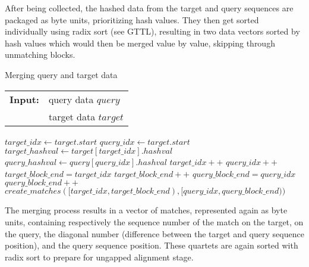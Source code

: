 After being collected, the hashed data from the target and query sequences are packaged as byte units, prioritizing hash values. They then get sorted individually using radix sort (see GTTL), resulting in two data vectors sorted by hash values which would then be merged value by value, skipping through unmatching blocks.

\begin{algorithm}[t]
\caption{Merging query and target data}
\label{code:merging_data}
\begin{tabular}{@{}l@{~}l}
\textbf{Input:}&query data \(query\)\\
               &target data \(target\)
\end{tabular}
\begin{algorithmic}
\State \(target\_idx \gets target.start\)
\State \(query\_idx \gets target.start\)
\State \(target\_hashval \gets target[target\_idx].hashval\)
\State \(query\_hashval \gets query[query\_idx].hashval\)
 
\State \(target\_idx++\)
\EndWhile
\Else
{} 
\State \(query\_idx++\)
\EndWhile
\Else {}
\State \(target\_block\_end = target\_idx\) 
\State \(target\_block\_end++\)
\EndWhile
\State \(query\_block\_end = query\_idx\)
\State \(query\_block\_end++\)
\EndWhile
\State \(create\_matches([target\_idx,target\_block\_end),[query\_idx,query\_block\_end))\)
\EndIf
\EndIf
\EndWhile
\end{algorithmic}
\end{algorithm}

The merging process results in a vector of matches, represented again as byte units, containing respectively the sequence number of the match on the target, on the query, the diagonal number (difference between the target and query sequence position), and the query sequence position. These quartets are again sorted with radix sort to prepare for ungapped alignment stage.
